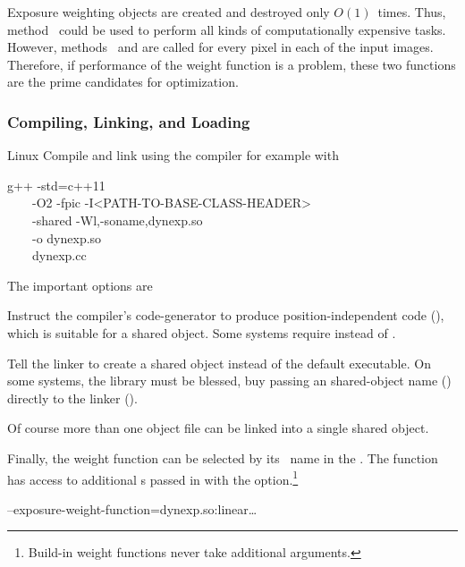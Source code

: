 Exposure weighting objects are created and destroyed only
$O(1)$~times.  Thus, method~ could be used to perform
all kinds of computationally expensive tasks.  However,
methods~ and  are called for every pixel
in each of the input images.  Therefore, if performance of the weight
function is a problem, these two functions are the prime candidates
for optimization.


\subsubsection[Compiling, Linking, and Loading]%
{Compiling, Linking, and Loading
  \label{sec:compiling-linking-loading}}

\begin{restrictedmaterial}{Linux}
  \noindent Compile and link using the  compiler for
  example with
  \begin{literal}
    g++ -std=c++11 \bslash \\
    ~~~~-O2 -fpic -I<PATH-TO-BASE-CLASS-HEADER> \bslash \\
    ~~~~-shared -Wl,-soname,dynexp.so \bslash \\
    ~~~~-o dynexp.so \bslash \\
    ~~~~dynexp.cc
  \end{literal}

  The important options are
  \begin{codelist}
  \item[\option{-fpic}]\itemend Instruct the compiler's code-generator
    to produce position\hyp{}independent code (), which
    is suitable for a shared object.  Some systems require
     instead of .

  \item[\option{-shared}]\itemend Tell the linker to create a shared
    object instead of the default executable.  On some systems, the
    library must be blessed, buy passing an shared-object name
    () directly to the linker ().

    Of course more than one object file can be linked into a single
    shared object.
  \end{codelist}

  Finally, the weight function can be selected by its
  ~name in the .  The function
  has access to additional s passed in with the
  option.\footnote{Build-in weight functions never take additional
    arguments.}

  \begin{literal}
    \app{} --exposure-weight-function=dynexp.so:linear\dots
  \end{literal}
\end{restrictedmaterial}

